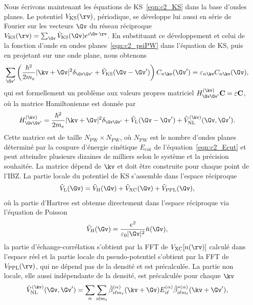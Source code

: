 Nous écrivons maintenant les équations de KS~\eqref{eqn:c2_KS} dans la base d'ondes planes. Le potentiel $V_\text{KS}(\rv)$, périodique, se développe lui aussi en série de Fourier sur les vecteurs $\Gv$ du réseau réciproque $V_\text{KS}(\rv)=\sum_\Gv \tilde V_\text{KS}(\Gv)e^{i\Gv\cdot\rv}$. En substituant ce développement et celui de la fonction d'onde en ondes planes~\eqref{eqn:c2_psiPW} dans l'équation de KS, puis en projetant sur une onde plane, nous obtenons
\begin{equation}
    \sum_{\Gv'}\left(\frac{\hbar^2}{2m_e}|\kv+\Gv|^2\delta_{\Gv\Gv'}+\tilde{V}_\text{KS}(\Gv-\Gv')\right)C_{n\kv}(\Gv')=\varepsilon_{n\kv}C_{n\kv}(\Gv),
    \label{eqn:c2_KSPW}
\end{equation}
qui est formellement un problème aux valeurs propres matriciel $H^{(\kv)}_{\Gv\Gv'}\mathbf{C}=\varepsilon\mathbf{C}$, où la matrice Hamiltonienne est donnée par
\begin{equation}
    H^{(\kv)}_{\Gv\Gv'}=\frac{\hbar^2}{2m_e}|\kv+\Gv|^2\delta_{\Gv\Gv'}+\tilde{V}_\text{L}(\Gv-\Gv')+\tilde{V}^{(\kv)}_\text{NL}(\Gv,\Gv').
    \label{eqn:c2_HGG}
\end{equation}
Cette matrice est de taille $N_\text{PW}\times N_\text{PW}$, où $N_\text{PW}$ est le nombre d'ondes planes déterminé par la coupure d'énergie cinétique $E_\text{cut}$ de l'équation~\eqref{eqn:c2_Ecut} et peut atteindre plusieurs dizaines de milliers selon le système et la précision souhaitée. La matrice dépend de $\kv$ et doit être construite pour chaque point de l'IBZ. La partie locale du potentiel de KS s'assemble dans l'espace réciproque
\begin{equation}
    \tilde{V}_\text{L}(\Gv) = \tilde{V}_\text{H}(\Gv)+\tilde{V}_\text{XC}(\Gv)+\tilde{V}_\text{PPL}(\Gv),
\end{equation}
où la partie d'Hartree est obtenue directement dans l'espace réciproque via l'équation de Poisson
\begin{equation}
    \tilde{V}_\text{H}(\Gv) = \frac{e^2}{\varepsilon_0|\Gv|^2}\tilde{n}(\Gv),
\end{equation}
la partie d'échange-corrélation s'obtient par la FFT de $V_\text{XC}[n(\rv)]$ calculé dans l'espace réel et la partie locale du pseudo-potentiel s'obtient par la FFT de $V_\text{PPL}(\rv)$, qui ne dépend pas de la densité et est précalculée. La partie non locale, elle aussi indépendante de la densité, est précalculée pour chaque $\kv$
\begin{equation}
    \tilde{V}_\text{NL}^{(\kv)}(\Gv,\Gv') = \sum_\alpha\sum_{i\ell m_\ell}\tilde{\beta}_{i\ell m_\ell}^{(\alpha)}(\kv+\Gv)E_{i\ell}^{(\alpha)}\tilde{\beta}^{*(\alpha)}_{i\ell m_\ell}(\kv+\Gv'),\label{eqn:V_NL_k}
\end{equation}
